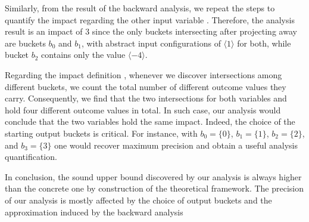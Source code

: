 Similarly, from the result of the backward analysis, we repeat the steps to quantify the impact regarding the other input variable \y{}.
Therefore, the analysis result is an impact of 3 since the only buckets intersecting after projecting away \y{} are buckets $b_0$ and $b_1$, with abstract input configurations of $\langle 1\rangle$ for both, while bucket $b_2$ contains only the value $\langle -4\rangle$.

Regarding the impact definition \outcomesname, whenever we discover intersections among different buckets, we count the total number of different outcome values they carry.
Consequently, we find that the two intersections for both variables \x{} and \y{} hold four different outcome values in total.
In such case, our analysis would conclude that the two variables hold the same impact.
Indeed, the choice of the starting output buckets is critical.
For instance, with $b_0=\{0\}$, $b_1=\{1\}$, $b_2=\{2\}$, and $b_3=\{3\}$ one would recover maximum precision and obtain a useful analysis quantification.

In conclusion, the sound upper bound discovered by our analysis is always higher than the concrete one by construction of the theoretical framework.
The precision of our analysis is mostly affected by the choice of output buckets and the approximation induced by the backward analysis 
